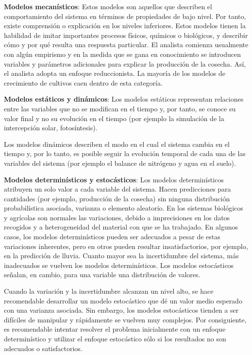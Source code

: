 \textbf{Modelos mecanísticos}: Estos modelos son aquellos que describen el comportamiento del sistema en términos de propiedades de bajo nivel. Por tanto, existe comprensión o explicación en los niveles inferiores. Estos modelos tienen la habilidad de imitar importantes procesos físicos, químicos o biológicos, y describir cómo y por qué resulta una respuesta particular. El analista comienza usualmente con algún empirismo y en la medida que se gana en conocimiento se introducen variables y parámetros adicionales para explicar la producción de la cosecha. Así, el analista adopta un enfoque reduccionista. La mayoría de los modelos de crecimiento de cultivos caen dentro de esta categoría. \parencite{galvez2008modelacion}

\textbf{Modelos estáticos y dinámicos}: Los modelos estáticos representan relaciones entre las variables que no se modifican en el tiempo y, por tanto, se conoce su valor final y no su evolución en el tiempo (por ejemplo la simulación de la intercepción solar, fotosíntesis). \parencite{bandi2003instrumentos}

Los modelos dinámicos describen el modo en el cual el sistema cambia en el tiempo y, por lo tanto, es posible seguir la evolución temporal de cada una de las variables del sistema (por ejemplo el balance de nitrógeno y agua en el suelo). \parencite{bandi2003instrumentos}

\textbf{Modelos determinísticos y estocásticos}: Los modelos determinísticos atribuyen un solo valor a cada variable del sistema. \parencite{bandi2003instrumentos} Hacen predicciones para cantidades (por ejemplo, producción de la cosecha) sin ninguna distribución probabilística asociada, varianza o elemento aleatorio. En los sistemas biológicos y agrícolas son normales las variaciones, debido a imprecisiones en los datos recogidos y a heterogeneidad del material con que se ha trabajado. En algunos casos, los modelos determinísticos pueden ser adecuados a pesar de estas variaciones inherentes, pero en otros pueden resultar insatisfactorios, por ejemplo, en la predicción de lluvia. Cuanto mayor sea la incertidumbre del sistema, más inadecuados se vuelven los modelos determinísticos. \parencite{galvez2008modelacion} Los modelos estocásticos señalan, en cambio, para una variable una distribución de valores. \parencite{bandi2003instrumentos}

Cuando la variación y la incertidumbre alcanzan un nivel alto, se hace recomendable desarrollar un modelo estocástico que dé un valor medio esperado con una varianza asociada. Sin embargo, los modelos estocásticos tienden a ser difíciles de manipular y rápidamente se vuelven muy complejos. Por consiguiente, es recomendable intentar resolver el problema inicialmente con un enfoque determinístico y utilizar el enfoque estocástico sólo si los resultados no son adecuados o satisfactorios. \parencite{galvez2008modelacion, hernandez2009modelos}

